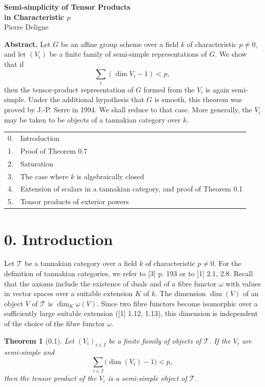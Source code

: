 \documentclass[10pt]{article}
\newcommand{\T}{\mathcal T}
\theoremstyle{deligne}
\newtheorem*{theorem*}{Theorem}
\begin{document}
\begin{center}
{\Large\bfseries Semi-simplicity of Tensor Products\\
in Characteristic \(p\)}\\[0.5em]
{\large Pierre Deligne}
\end{center}

\textbf{Abstract.} Let \(G\) be an affine group scheme over a field \(k\) of characteristic \(p\ne0\), and let \((V_i)\) be a finite family of semi-simple representations of \(G\). We show that if
\[
  \sum_i(\dim V_i-1)<p,
\]
then the tensor-product representation of \(G\) formed from the \(V_i\) is again semi-simple. Under the additional hypothesis that \(G\) is smooth, this theorem was proved by J.-P. Serre in 1994. We shall reduce to that case. More generally, the \(V_i\) may be taken to be objects of a tannakian category over \(k\).

\begin{center}
\begin{tabular}{rl}
0. & Introduction\\
1. & Proof of Theorem 0.7\\
2. & Saturation\\
3. & The case where \(k\) is algebraically closed\\
4. & Extension of scalars in a tannakian category, and proof of Theorem 0.1\\
5. & Tensor products of exterior powers
\end{tabular}
\end{center}

\section*{0. Introduction}

Let \(\T\) be a tannakian category over a field \(k\) of characteristic \(p\ne0\). For the definition of tannakian categories, we refer to [3] p. 193 or to [1] 2.1, 2.8. Recall that the axioms include the existence of duals and of a fibre functor \(\omega\) with values in vector spaces over a suitable extension \(K\) of \(k\). The dimension \(\dim(V)\) of an object \(V\) of \(\T\) is \(\dim_K\omega(V)\). Since two fibre functors become isomorphic over a sufficiently large suitable extension ([1] 1.12, 1.13), this dimension is independent of the choice of the fibre functor \(\omega\).

\begin{theorem*}[0.1]
Let \((V_i)_{i\in I}\) be a finite family of objects of \(\T\). If the \(V_i\) are semi-simple and
\[
  \sum_{i\in I}\bigl(\dim(V_i)-1\bigr)<p,
\]
then the tensor product of the \(V_i\) is a semi-simple object of \(\T\).
\end{theorem*}
\end{document}
